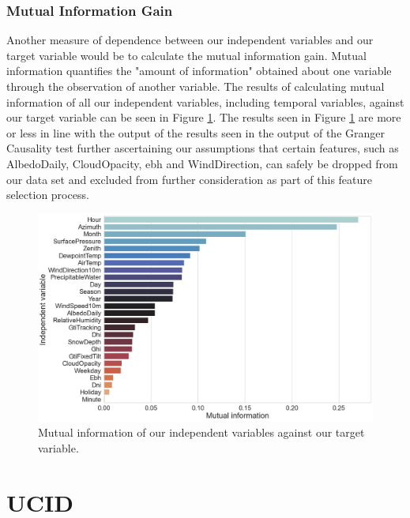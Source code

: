 \subsubsection{Mutual Information Gain}
\label{subsubsec:Exploratory-Data-Analysis:Causality-and-Correlation:Mutual-Information-Gain}
Another measure of dependence between our independent variables and our target variable would be to calculate the mutual information gain. Mutual information quantifies the "amount of information" obtained about one variable through the observation of another variable. The results of calculating mutual information of all our independent variables, including temporal variables, against our target variable can be seen in Figure \ref{fig:REFIT-House-12-Mutual-Information-Gain}. The results seen in Figure \ref{fig:REFIT-House-12-Mutual-Information-Gain} are more or less in line with the output of the results seen in the output of the Granger Causality test further ascertaining our assumptions that certain features, such as AlbedoDaily, CloudOpacity, \gls{ebh} and WindDirection, can safely be dropped from our data set and excluded from further consideration as part of this feature selection process.

\begin{figure}[H]
    \centering
    \includegraphics[width=\textwidth]{Images/Chapter 5/REFIT/REFIT-House-12-Mutual-Information-2.png}
    \caption{Mutual information of our independent variables against our target variable.}
    \label{fig:REFIT-House-12-Mutual-Information-Gain}
\end{figure}

\section{UCID}
\label{sec:Exploratory-Data-Analysis:UCID}